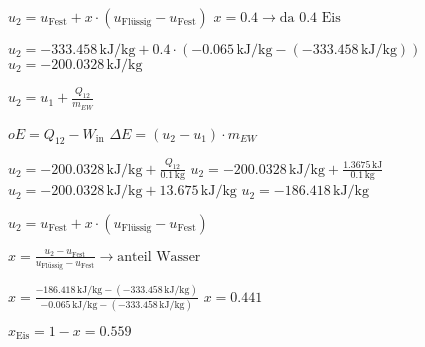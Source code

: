 \( u_{2} = u_{\text{Fest}} + x \cdot (u_{\text{Flüssig}} - u_{\text{Fest}}) \)  
\( x = 0.4 \rightarrow \text{da 0.4 Eis} \)  

\( u_{2} = -333.458 \, \text{kJ/kg} + 0.4 \cdot (-0.065 \, \text{kJ/kg} - (-333.458 \, \text{kJ/kg})) \)  
\( u_{2} = -200.0328 \, \text{kJ/kg} \)  

\( u_{2} = u_{1} + \frac{Q_{12}}{m_{EW}} \)  

\( oE = Q_{12} - W_{\text{in}} \)  
\( \Delta E = (u_{2} - u_{1}) \cdot m_{EW} \)  

\( u_{2} = -200.0328 \, \text{kJ/kg} + \frac{Q_{12}}{0.1 \, \text{kg}} \)  
\( u_{2} = -200.0328 \, \text{kJ/kg} + \frac{1.3675 \, \text{kJ}}{0.1 \, \text{kg}} \)  
\( u_{2} = -200.0328 \, \text{kJ/kg} + 13.675 \, \text{kJ/kg} \)  
\( u_{2} = -186.418 \, \text{kJ/kg} \)  

\( u_{2} = u_{\text{Fest}} + x \cdot (u_{\text{Flüssig}} - u_{\text{Fest}}) \)  

\( x = \frac{u_{2} - u_{\text{Fest}}}{u_{\text{Flüssig}} - u_{\text{Fest}}} \rightarrow \text{anteil Wasser} \)  

\( x = \frac{-186.418 \, \text{kJ/kg} - (-333.458 \, \text{kJ/kg})}{-0.065 \, \text{kJ/kg} - (-333.458 \, \text{kJ/kg})} \)  
\( x = 0.441 \)  

\( x_{\text{Eis}} = 1 - x = 0.559 \)